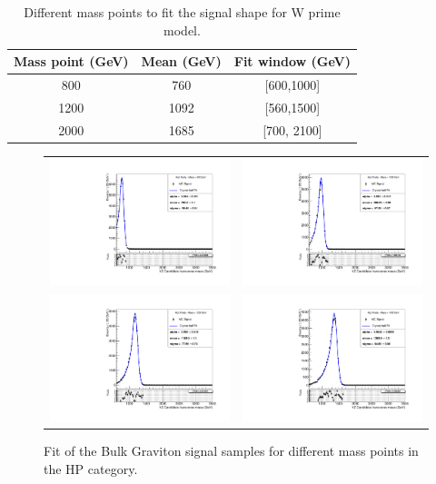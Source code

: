 \begin{table}[h]
\begin{center}
\caption{Different mass points to fit the signal shape for W prime model.}
\label{tab:Wprimesignals}
\begin{tabular}{ccc} \hline
Mass point (GeV) & Mean (GeV) &  Fit window (GeV) \\ \hline
800 & 760 & [600,1000] \\
1200 & 1092 & [560,1500] \\
2000 & 1685 & [700, 2100]\\
\end{tabular}
\end{center}
\end{table}

\begin{figure}[!ht]
\caption{ Fit of the Bulk Graviton signal samples for different mass points in the HP category.}
\begin{tabular}{cc}
  \includegraphics[width=170pt]{figuresARC/fits/BulkGravHP800.pdf} &
  \includegraphics[width=170pt]{figuresARC/fits/BulkGravHP1000.pdf}\\
  \includegraphics[width=170pt]{figuresARC/fits/BulkGravHP1200.pdf} &
\includegraphics[width=170pt]{figuresARC/fits/BulkGravHP1400.pdf}  \\

\end{tabular}
\end{figure}
